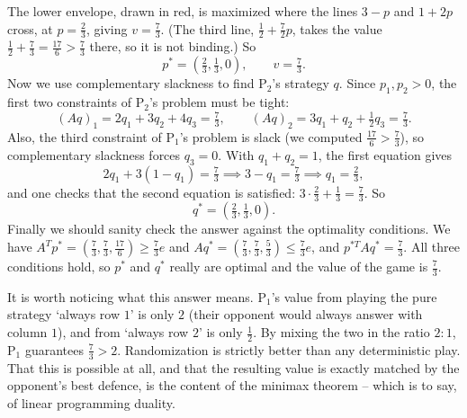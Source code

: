 \documentclass[a4paper]{scrartcl}
\begin{document}
\begin{example}
    The lower envelope, drawn in red, is maximized where the lines $3 - p$ and $1 + 2p$ cross, at $p = \frac23$, giving $v = \frac73$. (The third line, $\frac12 + \frac72 p$, takes the value $\frac12 + \frac73 = \frac{17}{6} > \frac73$ there, so it is not binding.) So
    $$
    p^* = \left(\tfrac23, \tfrac13, 0\right), \qquad v = \tfrac73.
    $$
    Now we use complementary slackness to find $\mathrm{P}_2$'s strategy $q$. Since $p_1, p_2 > 0$, the first two constraints of $\mathrm{P}_2$'s problem must be tight:
    $$
    (Aq)_1 = 2q_1 + 3q_2 + 4q_3 = \tfrac73, \qquad (Aq)_2 = 3q_1 + q_2 + \tfrac12 q_3 = \tfrac73.
    $$
    Also, the third constraint of $\mathrm{P}_1$'s problem is slack (we computed $\frac{17}{6} > \frac73$), so complementary slackness forces $q_3 = 0$. With $q_1 + q_2 = 1$, the first equation gives
    $$
    2q_1 + 3(1 - q_1) = \tfrac73 \implies 3 - q_1 = \tfrac73 \implies q_1 = \tfrac23,
    $$
    and one checks that the second equation is satisfied: $3\cdot\frac23 + \frac13 = \frac73$. So
    $$
    q^* = \left(\tfrac23, \tfrac13, 0\right).
    $$
    Finally we should sanity check the answer against the optimality conditions. We have $A^Tp^* = \left(\frac73, \frac73, \frac{17}{6}\right) \geq \frac73 e$ and $Aq^* = \left(\frac73, \frac73, \frac53\right) \leq \frac73 e$, and $p^{*T}Aq^* = \frac73$. All three conditions hold, so $p^*$ and $q^*$ really are optimal and the value of the game is $\frac73$.
\end{example}

\begin{remark}
    It is worth noticing what this answer means. $\mathrm{P}_1$'s value from playing the pure strategy `always row $1$' is only $2$ (their opponent would always answer with column $1$), and from `always row $2$' is only $\frac12$. By mixing the two in the ratio $2:1$, $\mathrm{P}_1$ guarantees $\frac73 > 2$. Randomization is strictly better than any deterministic play. That this is possible at all, and that the resulting value is exactly matched by the opponent's best defence, is the content of the minimax theorem -- which is to say, of linear programming duality.
\end{remark}
\end{document}
